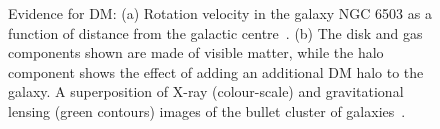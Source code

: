 \begin{figure}

  \caption{Evidence for \ac{DM}: (a) Rotation velocity in the galaxy NGC 6503 as a function of distance from the galactic centre~\cite{Freese:2008cz}. (b) The disk and gas components shown are made of visible matter, while the halo component shows the effect of adding an additional \ac{DM} halo to the galaxy. A superposition of X-ray (colour-scale) and gravitational lensing (green contours) images of the bullet cluster of galaxies~\cite{1538-4357-648-2-L109}.}
  \label{fig:dmevidence}
\end{figure}

